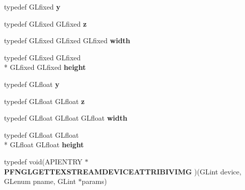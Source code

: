 \begin{DoxyCompactItemize}
\item 
\hypertarget{class_c_p_v_r_tgles_ext_a1a45d6b767dce7607bf6b06a4dc01c97}{typedef G\+Lfixed {\bfseries y}}\label{class_c_p_v_r_tgles_ext_a1a45d6b767dce7607bf6b06a4dc01c97}

\item 
\hypertarget{class_c_p_v_r_tgles_ext_a51da7934cd85e9158f53a7701f599471}{typedef G\+Lfixed G\+Lfixed {\bfseries z}}\label{class_c_p_v_r_tgles_ext_a51da7934cd85e9158f53a7701f599471}

\item 
\hypertarget{class_c_p_v_r_tgles_ext_aadb31a8496722f1c94fd509fcfa24b73}{typedef G\+Lfixed G\+Lfixed G\+Lfixed {\bfseries width}}\label{class_c_p_v_r_tgles_ext_aadb31a8496722f1c94fd509fcfa24b73}

\item 
\hypertarget{class_c_p_v_r_tgles_ext_a549e7c71bd88c24d2eeea31cd5d8925a}{typedef G\+Lfixed G\+Lfixed \\*
G\+Lfixed G\+Lfixed {\bfseries height}}\label{class_c_p_v_r_tgles_ext_a549e7c71bd88c24d2eeea31cd5d8925a}

\item 
\hypertarget{class_c_p_v_r_tgles_ext_a9a85c6ddc258c80923bd930af5beff91}{typedef G\+Lfloat {\bfseries y}}\label{class_c_p_v_r_tgles_ext_a9a85c6ddc258c80923bd930af5beff91}

\item 
\hypertarget{class_c_p_v_r_tgles_ext_a8e94a8df6b90ea235e156329583bf645}{typedef G\+Lfloat G\+Lfloat {\bfseries z}}\label{class_c_p_v_r_tgles_ext_a8e94a8df6b90ea235e156329583bf645}

\item 
\hypertarget{class_c_p_v_r_tgles_ext_a93bd6aac6f7fe1e28d70ce23319a5fc0}{typedef G\+Lfloat G\+Lfloat G\+Lfloat {\bfseries width}}\label{class_c_p_v_r_tgles_ext_a93bd6aac6f7fe1e28d70ce23319a5fc0}

\item 
\hypertarget{class_c_p_v_r_tgles_ext_afe57af20a116fb2841ed56fee00fc911}{typedef G\+Lfloat G\+Lfloat \\*
G\+Lfloat G\+Lfloat {\bfseries height}}\label{class_c_p_v_r_tgles_ext_afe57af20a116fb2841ed56fee00fc911}

\item 
\hypertarget{class_c_p_v_r_tgles_ext_aac0678635323caf7b49021f35f06e739}{typedef void(A\+P\+I\+E\+N\+T\+R\+Y $\ast$ {\bfseries P\+F\+N\+G\+L\+G\+E\+T\+T\+E\+X\+S\+T\+R\+E\+A\+M\+D\+E\+V\+I\+C\+E\+A\+T\+T\+R\+I\+B\+I\+V\+I\+M\+G} )(G\+Lint device, G\+Lenum pname, G\+Lint $\ast$params)}\label{class_c_p_v_r_tgles_ext_aac0678635323caf7b49021f35f06e739}


\end{DoxyCompactItemize}
